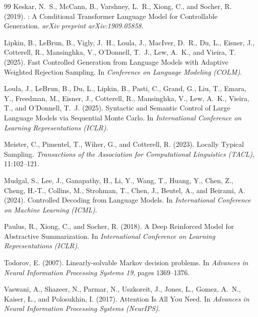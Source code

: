 \documentclass[11pt]{article}
\begin{document}
\begin{thebibliography}{99}
Keskar, N.~S., McCann, B., Varshney, L.~R., Xiong, C., and Socher, R. (2019).
: A Conditional Transformer Language Model for Controllable Generation.
\newblock \emph{arXiv preprint arXiv:1909.05858}.

Lipkin, B., LeBrun, B., Vigly, J.~H., Loula, J., MacIver, D.~R., Du, L., Eisner, J., Cotterell, R., Mansinghka, V., O'Donnell, T.~J., Lew, A.~K., and Vieira, T. (2025).
\newblock Fast Controlled Generation from Language Models with Adaptive Weighted Rejection Sampling.
\newblock In \emph{Conference on Language Modeling (COLM)}.

Loula, J., LeBrun, B., Du, L., Lipkin, B., Pasti, C., Grand, G., Liu, T., Emara, Y., Freedman, M., Eisner, J., Cotterell, R., Mansinghka, V., Lew, A.~K., Vieira, T., and O'Donnell, T.~J. (2025).
\newblock Syntactic and Semantic Control of Large Language Models via Sequential Monte Carlo.
\newblock In \emph{International Conference on Learning Representations (ICLR)}.

Meister, C., Pimentel, T., Wiher, G., and Cotterell, R. (2023).
\newblock Locally Typical Sampling.
\newblock \emph{Transactions of the Association for Computational Linguistics (TACL)}, 11:102--121.

Mudgal, S., Lee, J., Ganapathy, H., Li, Y., Wang, T., Huang, Y., Chen, Z., Cheng, H.-T., Collins, M., Strohman, T., Chen, J., Beutel, A., and Beirami, A. (2024).
\newblock Controlled Decoding from Language Models.
\newblock In \emph{International Conference on Machine Learning (ICML)}.

Paulus, R., Xiong, C., and Socher, R. (2018).
\newblock A Deep Reinforced Model for Abstractive Summarization.
\newblock In \emph{International Conference on Learning Representations (ICLR)}.

Todorov, E. (2007).
\newblock Linearly-solvable Markov decision problems.
\newblock In \emph{Advances in Neural Information Processing Systems 19}, pages 1369--1376.

Vaswani, A., Shazeer, N., Parmar, N., Uszkoreit, J., Jones, L., Gomez, A.~N., Kaiser, {\L}., and Polosukhin, I. (2017).
\newblock Attention Is All You Need.
\newblock In \emph{Advances in Neural Information Processing Systems (NeurIPS)}.


\end{thebibliography}
\end{document}
